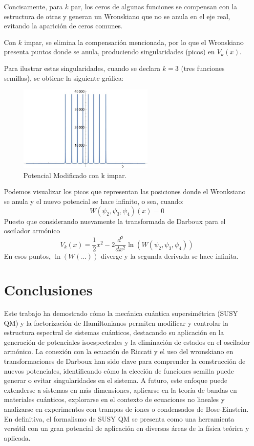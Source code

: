 \documentclass[%
 aip,
 jmp,%
 amsmath,amssymb,
 reprint,
]{revtex4-2}
\begin{document}
Concisamente, para \( k \) par, los ceros de algunas funciones se compensan con la estructura de otras y generan un Wronskiano que no se anula en el eje real, evitando la aparición de ceros comunes. 

Con \( k \) impar, se elimina la compensación mencionada, por lo que el Wronskiano presenta puntos donde se anula, produciendo singularidades (picos) en \( V_k(x) \). 

Para ilustrar estas singularidades, cuando se declara \( k = 3 \) (tres funciones semillas), se obtiene la siguiente gráfica:

\begin{figure}[H]
    \centering
    \includegraphics[width=0.6\textwidth]{QHO_Odd.jpeg}
    \caption{Potencial Modificado con k impar.}
    \label{fig:modified_oscillator}
\end{figure}
Podemos visualizar los picos que representan las posiciones donde el Wronksiano se anula y el nuevo potencial se hace infinito, o sea, cuando:
\begin{equation}
W(\psi_2, \psi_3, \psi_4)(x)=0
\end{equation}
Puesto que considerando nuevamente la transformada de Darboux para el oscilador armónico
\begin{equation}
V_k(x) = \frac{1}{2} x^2 - 2 \frac{d^2}{dx^2} \ln \left( W(\psi_2, \psi_3, \psi_4) \right)
\end{equation}
En esos puntos, \( \ln(W(\dots)) \) diverge y la segunda derivada se hace infinita.

\section{Conclusiones}
Este trabajo ha demostrado cómo la mecánica cuántica supersimétrica (SUSY QM) y la factorización de Hamiltonianos permiten modificar y controlar la estructura espectral de sistemas cuánticos, destacando su aplicación en la generación de potenciales isoespectrales y la eliminación de estados en el oscilador armónico. La conexión con la ecuación de Riccati y el uso del wronskiano en transformaciones de Darboux han sido clave para comprender la construcción de nuevos potenciales, identificando cómo la elección de funciones semilla puede generar o evitar singularidades en el sistema. A futuro, este enfoque puede extenderse a sistemas en más dimensiones, aplicarse en la teoría de bandas en materiales cuánticos, explorarse en el contexto de ecuaciones no lineales y analizarse en experimentos con trampas de iones o condensados de Bose-Einstein. En definitiva, el formalismo de SUSY QM se presenta como una herramienta versátil con un gran potencial de aplicación en diversas áreas de la física teórica y aplicada.
\end{document}

